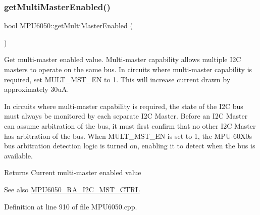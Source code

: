 \subsubsection{\texorpdfstring{getMultiMasterEnabled()}{getMultiMasterEnabled()}}
{\footnotesize\ttfamily bool M\+P\+U6050\+::get\+Multi\+Master\+Enabled (\begin{DoxyParamCaption}{ }\end{DoxyParamCaption})}

Get multi-\/master enabled value. Multi-\/master capability allows multiple I2C masters to operate on the same bus. In circuits where multi-\/master capability is required, set M\+U\+L\+T\+\_\+\+M\+S\+T\+\_\+\+EN to 1. This will increase current drawn by approximately 30uA.

In circuits where multi-\/master capability is required, the state of the I2C bus must always be monitored by each separate I2C Master. Before an I2C Master can assume arbitration of the bus, it must first confirm that no other I2C Master has arbitration of the bus. When M\+U\+L\+T\+\_\+\+M\+S\+T\+\_\+\+EN is set to 1, the M\+P\+U-\/60\+X0\textquotesingle{}s bus arbitration detection logic is turned on, enabling it to detect when the bus is available.

\begin{DoxyReturn}{Returns}
Current multi-\/master enabled value 
\end{DoxyReturn}
\begin{DoxySeeAlso}{See also}
\mbox{\hyperlink{MPU6050_8h_ae4804708dd5f21dbca1ff1815b883504}{M\+P\+U6050\+\_\+\+R\+A\+\_\+\+I2\+C\+\_\+\+M\+S\+T\+\_\+\+C\+T\+RL}} 
\end{DoxySeeAlso}


Definition at line 910 of file M\+P\+U6050.\+cpp.


\begin{DoxyCode}{0}

\end{DoxyCode}
\mbox{\label{classMPU6050_a6eb099e3dc96eb4d113cf81804256e8c}} 
